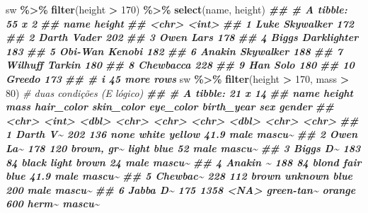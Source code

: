 \documentclass[
  portuguese,
  11pt,
  openany]{book}
\newenvironment{Shaded}{\begin{snugshade}}{\end{snugshade}}
\newcommand{\CommentTok}[1]{\textcolor[rgb]{0.56,0.35,0.01}{\textit{#1}}}
\newcommand{\DecValTok}[1]{\textcolor[rgb]{0.00,0.00,0.81}{#1}}
\newcommand{\DocumentationTok}[1]{\textcolor[rgb]{0.56,0.35,0.01}{\textbf{\textit{#1}}}}
\newcommand{\FunctionTok}[1]{\textcolor[rgb]{0.13,0.29,0.53}{\textbf{#1}}}
\newcommand{\NormalTok}[1]{#1}
\newcommand{\SpecialCharTok}[1]{\textcolor[rgb]{0.81,0.36,0.00}{\textbf{#1}}}
\newcounter{none} %
\begin{document}
\begin{Shaded}
\begin{Highlighting}[]
\NormalTok{sw }\SpecialCharTok{\%\textgreater{}\%} \FunctionTok{filter}\NormalTok{(height }\SpecialCharTok{\textgreater{}} \DecValTok{170}\NormalTok{) }\SpecialCharTok{\%\textgreater{}\%} \FunctionTok{select}\NormalTok{(name, height)}
\DocumentationTok{\#\# \# A tibble: 55 x 2}
\DocumentationTok{\#\#    name              height}
\DocumentationTok{\#\#    \textless{}chr\textgreater{}              \textless{}int\textgreater{}}
\DocumentationTok{\#\#  1 Luke Skywalker       172}
\DocumentationTok{\#\#  2 Darth Vader          202}
\DocumentationTok{\#\#  3 Owen Lars            178}
\DocumentationTok{\#\#  4 Biggs Darklighter    183}
\DocumentationTok{\#\#  5 Obi{-}Wan Kenobi       182}
\DocumentationTok{\#\#  6 Anakin Skywalker     188}
\DocumentationTok{\#\#  7 Wilhuff Tarkin       180}
\DocumentationTok{\#\#  8 Chewbacca            228}
\DocumentationTok{\#\#  9 Han Solo             180}
\DocumentationTok{\#\# 10 Greedo               173}
\DocumentationTok{\#\# \# i 45 more rows}
\NormalTok{sw }\SpecialCharTok{\%\textgreater{}\%} \FunctionTok{filter}\NormalTok{(height }\SpecialCharTok{\textgreater{}} \DecValTok{170}\NormalTok{, mass }\SpecialCharTok{\textgreater{}} \DecValTok{80}\NormalTok{)            }\CommentTok{\# duas condições (E lógico)}
\DocumentationTok{\#\# \# A tibble: 21 x 14}
\DocumentationTok{\#\#    name     height  mass hair\_color skin\_color eye\_color birth\_year sex   gender}
\DocumentationTok{\#\#    \textless{}chr\textgreater{}     \textless{}int\textgreater{} \textless{}dbl\textgreater{} \textless{}chr\textgreater{}      \textless{}chr\textgreater{}      \textless{}chr\textgreater{}          \textless{}dbl\textgreater{} \textless{}chr\textgreater{} \textless{}chr\textgreater{} }
\DocumentationTok{\#\#  1 Darth V\textasciitilde{}    202   136 none       white      yellow          41.9 male  mascu\textasciitilde{}}
\DocumentationTok{\#\#  2 Owen La\textasciitilde{}    178   120 brown, gr\textasciitilde{} light      blue            52   male  mascu\textasciitilde{}}
\DocumentationTok{\#\#  3 Biggs D\textasciitilde{}    183    84 black      light      brown           24   male  mascu\textasciitilde{}}
\DocumentationTok{\#\#  4 Anakin \textasciitilde{}    188    84 blond      fair       blue            41.9 male  mascu\textasciitilde{}}
\DocumentationTok{\#\#  5 Chewbac\textasciitilde{}    228   112 brown      unknown    blue           200   male  mascu\textasciitilde{}}
\DocumentationTok{\#\#  6 Jabba D\textasciitilde{}    175  1358 \textless{}NA\textgreater{}       green{-}tan\textasciitilde{} orange         600   herm\textasciitilde{} mascu\textasciitilde{}}

\end{Highlighting}
\end{Shaded}
\end{document}
